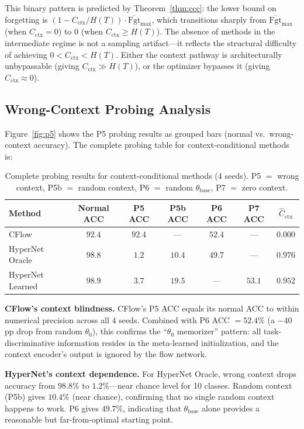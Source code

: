 \documentclass{article}
\begin{document}
This binary pattern is predicted by Theorem~\ref{thm:ccc}: the lower bound on forgetting is $(1 - C_\mathrm{ctx}/H(T)) \cdot \overline{\mathrm{Fgt}}_\mathrm{max}$, which transitions sharply from $\overline{\mathrm{Fgt}}_\mathrm{max}$ (when $C_\mathrm{ctx} = 0$) to $0$ (when $C_\mathrm{ctx} \geq H(T)$). The absence of methods in the intermediate regime is not a sampling artifact---it reflects the structural difficulty of achieving $0 < C_\mathrm{ctx} < H(T)$. Either the context pathway is architecturally unbypassable (giving $C_\mathrm{ctx} \gg H(T)$), or the optimizer bypasses it (giving $C_\mathrm{ctx} \approx 0$).

\subsection{Wrong-Context Probing Analysis}
\label{sec:p5_results}

Figure~\ref{fig:p5} shows the P5 probing results as grouped bars (normal vs.\ wrong-context accuracy). The complete probing table for context-conditional methods is:

\begin{table}[t]
\centering
\caption{Complete probing results for context-conditional methods (4 seeds). P5 $=$ wrong context, P5b $=$ random context, P6 $=$ random $\theta_\mathrm{base}$, P7 $=$ zero context.}
\label{tab:probing}
\small
\begin{tabular}{lcccccc}
\toprule
Method & Normal ACC & P5 ACC & P5b ACC & P6 ACC & P7 ACC & $\hat{C}_\mathrm{ctx}$ \\
\midrule
CFlow         & $92.4$ & $92.4$ & --- & $52.4$ & --- & $0.000$ \\
HyperNet Oracle  & $98.8$ & $1.2$  & $10.4$ & $49.7$ & --- & $0.976$ \\
HyperNet Learned & $98.9$ & $3.7$  & $19.5$ & --- & $53.1$ & $0.952$ \\
\bottomrule
\end{tabular}
\end{table}

\textbf{CFlow's context blindness.} CFlow's P5 ACC equals its normal ACC to within numerical precision across all 4 seeds. Combined with P6 ACC $= 52.4\%$ (a $-40$pp drop from random $\theta_0$), this confirms the ``$\theta_0$ memorizer'' pattern: all task-discriminative information resides in the meta-learned initialization, and the context encoder's output is ignored by the flow network.

\textbf{HyperNet's context dependence.} For HyperNet Oracle, wrong context drops accuracy from $98.8\%$ to $1.2\%$---near chance level for 10 classes. Random context (P5b) gives $10.4\%$ (near chance), confirming that no single random context happens to work. P6 gives $49.7\%$, indicating that $\theta_\mathrm{base}$ alone provides a reasonable but far-from-optimal starting point.
\end{document}
